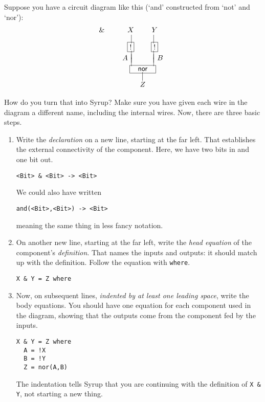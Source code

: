 \documentclass{article}
\newcommand{\C}{\mathsf}
\begin{document}
Suppose you have a circuit diagram like this (`and' constructed from
`not' and `nor'):
\[\& \qquad
  \begin{array}[t]{cccc}
    \multicolumn{2}{c}{X} & \multicolumn{2}{c}{Y} \\
    \multicolumn{1}{c|}{} &\;\;&\;\;& \multicolumn{1}{|c}{\;\;} \vspace{-0.025in}\\
    \multicolumn{2}{c}{\fbx{!}} & \multicolumn{2}{c}{\fbx{!}} \vspace{-0.025in}\\
    \multicolumn{1}{c|}{} &&& \multicolumn{1}{|c}{} \vspace{-0.1in}\\
    \multicolumn{1}{r|}{A} &&& \multicolumn{1}{|l}{B} \vspace{-0.1in}\\
    \multicolumn{1}{c|}{} &&& \multicolumn{1}{|c}{}\vspace{-0.025in}\\
    \multicolumn{4}{c}{\fbx{\;\;\;\C{nor}\;\;\;}}\vspace{-0.025in}\\
    \multicolumn{2}{c|}{} & \\
    \multicolumn{4}{c}{Z}
\end{array}  \]

How do you turn that into Syrup? Make sure you have given each wire in
the diagram a different name, including the internal wires. Now, there are three basic steps.
\begin{enumerate}
\item Write the \emph{declaration} on a new line, starting at the far
  left. That establishes the external
  connectivity of the component. Here, we have two bits in and one bit
  out.
\begin{verbatim}
<Bit> & <Bit> -> <Bit>
\end{verbatim}
  We could also have written
\begin{verbatim}
and(<Bit>,<Bit>) -> <Bit>
\end{verbatim}
  meaning the same thing in less fancy notation.
\item On another new line, starting at the far left, write the
  \emph{head equation} of the component's \emph{definition}. That
  names the inputs and outputs: it should match up with the
  definition. Follow the equation with \verb&where&.
\begin{verbatim}
X & Y = Z where
\end{verbatim}
\item Now, on subsequent lines, \emph{indented by at least one leading
  space}, write the body equations. You should have one equation for
  each component used in the diagram, showing that the outputs come
  from the component fed by the inputs.
\begin{verbatim}
X & Y = Z where
  A = !X
  B = !Y
  Z = nor(A,B)
\end{verbatim}
The indentation tells Syrup that you are continuing with the
definition of \verb!X & Y!, not starting a new thing.
\end{enumerate}
\end{document}
